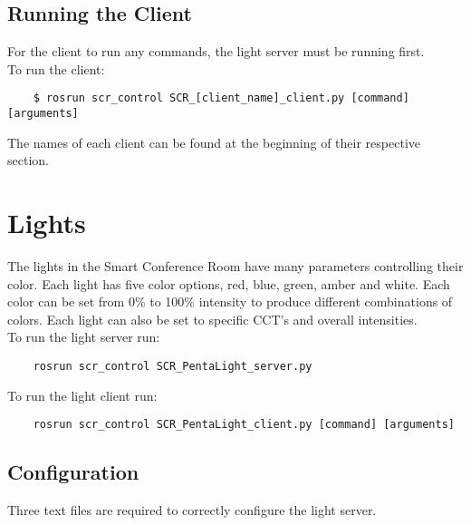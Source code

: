 \documentclass[twoside]{article}
\begin{document}
 	\subsection{Running the Client}
 	For the client to run any commands, the light server must be running first.\\
 	To run the client:
 	
 	\begin{verbatim}
 	$ rosrun scr_control SCR_[client_name]_client.py [command] [arguments]
 	\end{verbatim}
 	The names of each client can be found at the beginning of their respective section.
 	

	\section{Lights}
	The lights in the Smart Conference Room have many parameters controlling their color. Each light has five color options, red, blue, green, amber and white. Each color can be set from 0\% to 100\% intensity to produce different combinations of colors. Each light can also be set to specific CCT's and overall intensities. \\
	
	To run the light server run:
	\begin{verbatim}
	rosrun scr_control SCR_PentaLight_server.py
	\end{verbatim}
	
	To run the light client run:
	\begin{verbatim}
	rosrun scr_control SCR_PentaLight_client.py [command] [arguments]
	\end{verbatim}	

	
	\subsection{Configuration}
	Three text files are required to correctly configure the light server.
	
\end{document}
